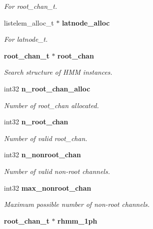 \begin{DoxyCompactItemize}
\begin{DoxyCompactList}\small\item\em For root\-\_\-chan\-\_\-t. \end{DoxyCompactList}\item 
listelem\-\_\-alloc\-\_\-t $\ast$ {\bf latnode\-\_\-alloc}\label{structngram__search__s_a21600dc2e23744f0be9c64a4db8d7e50}

\begin{DoxyCompactList}\small\item\em For latnode\-\_\-t. \end{DoxyCompactList}\item 
{\bf root\-\_\-chan\-\_\-t} $\ast$ {\bf root\-\_\-chan}
\begin{DoxyCompactList}\small\item\em Search structure of H\-M\-M instances. \end{DoxyCompactList}\item 
int32 {\bf n\-\_\-root\-\_\-chan\-\_\-alloc}\label{structngram__search__s_abc8a67e3f64adc470c78dfdd23be4126}

\begin{DoxyCompactList}\small\item\em Number of root\-\_\-chan allocated. \end{DoxyCompactList}\item 
int32 {\bf n\-\_\-root\-\_\-chan}\label{structngram__search__s_a297d8bdb856617490ee8ccd99df70e68}

\begin{DoxyCompactList}\small\item\em Number of valid root\-\_\-chan. \end{DoxyCompactList}\item 
int32 {\bf n\-\_\-nonroot\-\_\-chan}\label{structngram__search__s_a043723786367f5026dce99c261f7086d}

\begin{DoxyCompactList}\small\item\em Number of valid non-\/root channels. \end{DoxyCompactList}\item 
int32 {\bf max\-\_\-nonroot\-\_\-chan}\label{structngram__search__s_a4b2b42349e9e3df7e93b4a7d6994f63f}

\begin{DoxyCompactList}\small\item\em Maximum possible number of non-\/root channels. \end{DoxyCompactList}\item 
{\bf root\-\_\-chan\-\_\-t} $\ast$ {\bf rhmm\-\_\-1ph}\label{structngram__search__s_a1ffa3c9100252122ae8a2a713c50b527}


\end{DoxyCompactItemize}
